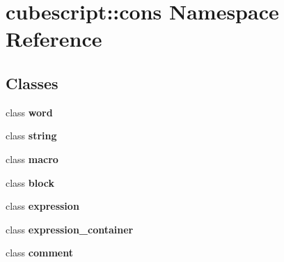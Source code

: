 \section{cubescript::cons Namespace Reference}
\label{namespacecubescript_1_1cons}


\subsection*{Classes}
\begin{CompactItemize}
\item 
class {\bf word}
\item 
class {\bf string}
\item 
class {\bf macro}
\item 
class {\bf block}
\item 
class {\bf expression}
\item 
class {\bf expression\_\-container}
\item 
class {\bf comment}
\end{CompactItemize}
